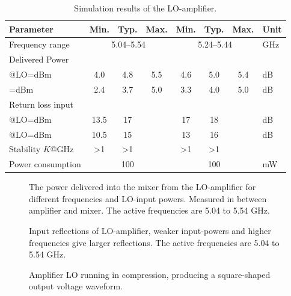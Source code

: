 			\begin{table}[hbt!]
				\caption[Simulation results of the LO-amplifier.]{Simulation results of the LO-amplifier.\disclaimer}
				\label{tab:resultlo}
				\centering
				\begin{tabular}{ l c c c c c c l } \toprule
					Parameter & Min. & Typ. & Max. & Min. & Typ. & Max. & Unit \\\midrule
					Frequency range & \multicolumn{3}{c}{5.04--5.54} & \multicolumn{3}{c}{5.24--5.44} & GHz \\
					Delivered Power & & & & & & \\
						\qquad @LO=\unit[-2--0]{dBm} 		& 4.0 & 4.8 & 5.5 & 4.6 & 5.0 & 5.4 & dB \\
						\qquad@LO=\unit[-4-- -2]{dBm} 		& 2.4 & 3.7 & 5.0 & 3.3 & 4.0 & 5.0 & dB \\						
					Return loss input  & & & & & & \\
						\qquad @LO=\unit[-2--0]{dBm} 	& 13.5 & 17 & & 17 & 18 & & dB \\
						\qquad @LO=\unit[-4-- -2]{dBm} 	& 10.5 & 15 & & 13 & 16 & & dB \\
					Stability $K$@\unit[0--80]{GHz} & >1 & >1 &  & >1 & >1 &  & \\
					Power consumption &  & 100 &  & & 100 & & mW  \\\bottomrule
				\end{tabular}
			\end{table}

			\begin{figure}[hbt!]
				\centering
				\caption[Output power from LO-amplifier]{The power delivered into the mixer from the LO-amplifier for different frequencies and LO-input powers. Measured in between amplifier and mixer. The active frequencies are 5.04 to 5.54 GHz.}\label{fig:lo_delivered_power}
			\end{figure}
			
			\begin{figure}[hbt!]
				\centering
				\caption[Input reflections of LO-amplifier]{Input reflections of LO-amplifier, weaker input-powers and higher frequencies give larger reflections. The active frequencies are 5.04 to 5.54 GHz.}\label{fig:lo_reflections}
			\end{figure}
		
			\begin{figure}[hbt!]
				\centering
				\caption[Amplifier LO waveform]{Amplifier LO running in compression, producing a square-shaped output voltage waveform.}\label{fig:lo_waveform}
			\end{figure}		
		
